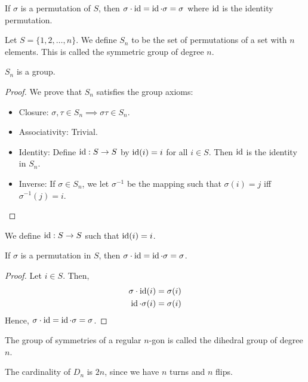     \begin{thm}
        If \(\sigma\) is a permutation of \(S\), then \(\sigma \cdot \operatorname{id} = \operatorname{id} \cdot \sigma = \sigma\) where \(\operatorname{id}\) is the identity permutation.
    \end{thm}

    \begin{dfn}
        Let \(S = \{1, 2, \ldots, n\}\). We define \(S_n\) to be the set of permutations of a set with \(n\) elements. This is called the symmetric group of degree \(n\).
    \end{dfn}

    \begin{thm}
        \(S_n\) is a group.
    \end{thm}

    \begin{proof}
        We prove that \(S_n\) satisfies the group axioms:
        \begin{itemize}
            \item Closure: \(\sigma, \tau \in S_n \implies \sigma\tau \in S_n\).
            \item Associativity: Trivial.
            \item Identity: Define \(\operatorname{id} : S \to S\) by \(\operatorname{id}(i) = i\) for all \(i\in S\). Then \(\operatorname{id}\) is the identity in \(S_n\).
            \item Inverse: If \(\sigma\in S_n\), we let \(\sigma^{-1}\) be the mapping such that \(\sigma(i) = j\) iff \(\sigma^{-1}(j) = i\). 
        \end{itemize}
    \end{proof}

    \begin{dfn}
        We define \(\operatorname{id} : S \to S\) such that \(\operatorname{id}(i) = i\).
    \end{dfn}

    \begin{cor}
        If \(\sigma\) is a permutation in \(S\), then \(\sigma \cdot \operatorname{id} = \operatorname{id} \cdot \sigma = \sigma\).
    \end{cor}

    \begin{proof}
        Let \(i\in S\). Then,
        \begin{align*}
            \sigma \cdot \operatorname{id}(i) &= \sigma (i) \\
            \operatorname{id} \cdot \sigma(i) &= \sigma (i)
        \end{align*}
        Hence, \(\sigma \cdot \operatorname{id} = \operatorname{id} \cdot \sigma = \sigma\).
    \end{proof}

    \begin{dfn}
        The group of symmetries of a regular \(n\)-gon is called the dihedral group of degree \(n\).
    \end{dfn}

    The cardinality of \(D_n\) is \(2n\), since we have \(n\) turns and \(n\) flips.